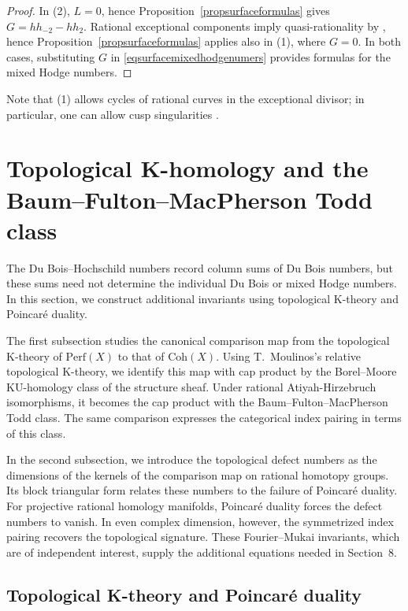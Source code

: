\documentclass{amsart}
\theoremstyle{plain}
\theoremstyle{definition}
\newcommand{\Perf}{\mathrm{Perf}}
\newcommand{\KU}{\mathrm{KU}}
\newcommand{\Coh}{\mathrm{Coh}}
\begin{document}
\begin{proof}

In (2), $L=0$, hence Proposition~\ref{propsurfaceformulas} gives $G=hh_{-2}-hh_2$. Rational exceptional components imply quasi-rationality by \cite[Corollary 5.4]{AH26}, hence Proposition~\ref{propsurfaceformulas} applies also in (1), where $G=0$. In both cases, substituting $G$ in \eqref{eqsurfacemixedhodgenumers} provides formulas for the mixed Hodge numbers.
\end{proof}

Note that (1) allows cycles of rational curves in the exceptional divisor; in particular, one can allow cusp singularities \cite[Example 5.5]{AH26}. 


\section{Topological K-homology and the Baum--Fulton--MacPherson Todd class}
\label{sectopologicalcomparison}

The Du Bois--Hochschild numbers record column sums of Du Bois numbers, but these sums need not determine the individual Du Bois or mixed Hodge numbers. In this section, we construct additional invariants using topological K-theory and Poincar\'e duality.

The first subsection studies the canonical comparison map from the topological K-theory of $\Perf(X)$ to that of $\Coh(X)$. Using T.~Moulinos's relative topological K-theory, we identify this map with cap product by the Borel--Moore $\KU$-homology class of the structure sheaf.
Under rational Atiyah-Hirzebruch isomorphisms, it becomes the cap product with the Baum--Fulton--MacPherson Todd class. The same comparison expresses the categorical index pairing in terms of this class.

In the second subsection, we introduce the topological defect numbers as the dimensions of the kernels of the comparison map on rational homotopy groups. Its block triangular form relates these numbers to the failure of Poincar\'e duality. For projective rational homology manifolds, Poincar\'e duality forces the defect numbers to vanish. In even complex dimension, however, the symmetrized index pairing recovers the topological signature. These Fourier--Mukai invariants, which are of independent interest, supply the additional equations needed in Section~8.

\subsection{Topological K-theory and Poincar\'e duality}
\end{document}

